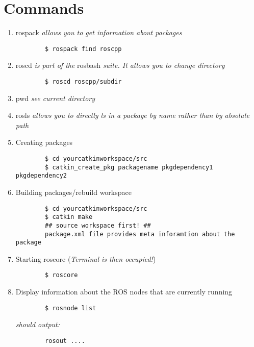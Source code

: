 \documentclass[11pt]{article}
\begin{document}
\section*{Commands}
\begin{enumerate}
    \item rospack \textit{allows you to get information
    about packages} \\
    \begin{verbatim}
        $ rospack find roscpp
    \end{verbatim}
    \item roscd \textit{ is part of the } rosbash \textit{suite. It allows you to change directory} \\
    \begin{verbatim}
        $ roscd roscpp/subdir
    \end{verbatim}
    \item pwd \textit{see current directory}
    \item rosls \textit{allows you to directly ls in a package by name rather than by absolute path}

    \item Creating packages
    \begin{verbatim}
        $ cd yourcatkinworkspace/src
        $ catkin_create_pkg packagename pkgdependency1 pkgdependency2
    \end{verbatim}
    \item Building packages/rebuild workspace
    \begin{verbatim}
        $ cd yourcatkinworkspace/src
        $ catkin make
        ## source workspace first! ##
        package.xml file provides meta inforamtion about the package
    \end{verbatim}
    \item Starting roscore (\textit{Terminal is then occupied!})
    \begin{verbatim}
        $ roscore
    \end{verbatim}
    \item Display information about the ROS nodes that are currently running
    \begin{verbatim}
        $ rosnode list
    \end{verbatim}
    \textit{should output:}
    \begin{verbatim}
        rosout ....
    \end{verbatim}
\end{enumerate} 
\end{document}
